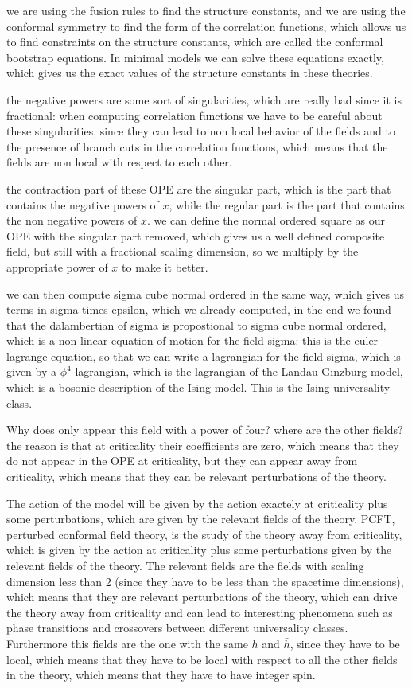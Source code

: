we are using the fusion rules to find the structure constants, and we are using the conformal symmetry to find the form of the correlation functions, which allows us to find constraints on the structure constants, which are called the conformal bootstrap equations. In minimal models we can solve these equations exactly, which gives us the exact values of the structure constants in these theories.

the negative powers are some sort of singularities, which are really bad since it is fractional: when computing correlation functions we have to be careful about these singularities, since they can lead to non local behavior of the fields and to the presence of branch cuts in the correlation functions, which means that the fields are non local with respect to each other.

the contraction part of these OPE are the singular part, which is the part that contains the negative powers of \(x\), while the regular part is the part that contains the non negative powers of \(x\). we can define the normal ordered square as our OPE with the singular part removed, which gives us a well defined composite field, but still with a fractional scaling dimension, so we multiply by the appropriate power of \(x\) to make it better.

we can then compute sigma cube normal ordered in the same way, which gives us terms in sigma times epsilon, which we already computed, in the end we found that the dalambertian of sigma is propostional to sigma cube normal ordered, which is a non linear equation of motion for the field sigma: this is the euler lagrange equation, so that we can write a lagrangian for the field sigma, which is given by a \(\phi^4\) lagrangian, which is the lagrangian of the Landau-Ginzburg model, which is a bosonic description of the Ising model. This is the Ising universality class.

Why does only appear this field with a power of four? where are the other fields? the reason is that at criticality their coefficients are zero, which means that they do not appear in the OPE at criticality, but they can appear away from criticality, which means that they can be relevant perturbations of the theory.

The action of the model will be given by the action exactely at criticality plus some perturbations, which are given by the relevant fields of the theory. PCFT, perturbed conformal field theory, is the study of the theory away from criticality, which is given by the action at criticality plus some perturbations given by the relevant fields of the theory. The relevant fields are the fields with scaling dimension less than 2 (since they have to be less than the spacetime dimensions), which means that they are relevant perturbations of the theory, which can drive the theory away from criticality and can lead to interesting phenomena such as phase transitions and crossovers between different universality classes. Furthermore this fields are the one with the same \(h\) and \(\bar{h}\), since they have to be local, which means that they have to be local with respect to all the other fields in the theory, which means that they have to have integer spin. 

